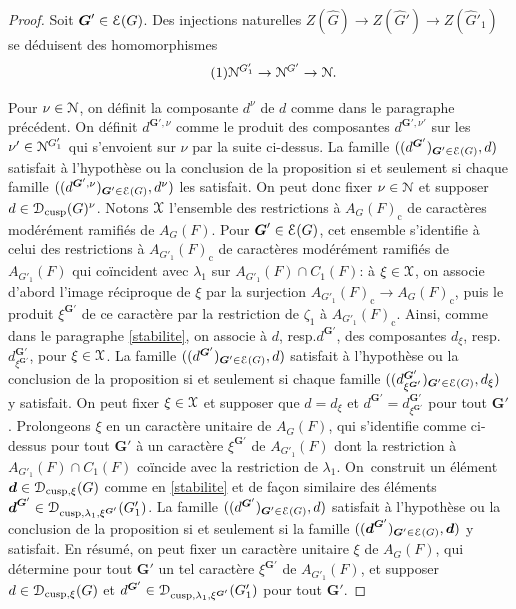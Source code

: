 \documentclass[11pt]{article}
\newcommand{\resp}{resp.\xspace}
\numberwithin{equation}{section}\providecommand{\og}{«\,}\providecommand{\fg}{\,»}
\let\mathcal \EuScript
\newcommand{\rc}{\mathrm{c}}
\newcommand{\cusp}{\mathrm{cusp}}
\newcommand{\bmd}{\boldsymbol{d}}
\newcommand{\bG}{\boldsymbol{G}}
\newcommand{\cD}{\mathcal{D}}
\newcommand{\cE}{\mathcal{E}}
\newcommand{\cN}{\mathcal{N}}
\newcommand{\cX}{\mathcal{X}}
\theoremstyle{plain}
\theoremstyle{definition}
\begin{document}
\begin{proof}
Soit $\bG'\in \cE(G)$. Des injections naturelles $Z(\hat{G})\to Z(\hat{G}')\to Z(\hat{G}'_{1})$ se déduisent des homomorphismes\vspace*{-3pt}
\begin{equation}\tag{1}\label{finale1}
\cN^{G'_{1}}\to \cN^{G'}\to \cN.
\end{equation}

Pour $\nu\in \cN$, on définit la composante $d^{\nu}$ de $d$ comme dans le paragraphe précédent. On définit $d^{\bG',\nu}$ comme le produit des composantes $d^{\bG',\nu'}$ sur les $\nu'\in \cN^{G'_{1}}$ qui s'envoient sur $\nu$ par la suite ci-dessus. La famille $((d^{\bG'})_{\bG'\in \cE(G)},d)$ satisfait à l'hypothèse ou la conclusion de la proposition si et seulement si chaque famille $((d^{\bG',\nu})_{\bG'\in \cE(G)},d^{\nu})$ les satisfait. On peut donc fixer $\nu\in \cN$ et supposer $d\in \cD_{\cusp}(G)^{\nu}$. Notons $\cX$ l'ensemble des restrictions à $A_{G}(F)_{\rc}$ de caractères modérément ramifiés de $A_{G}(F)$. Pour $\bG'\in \cE(G)$, cet ensemble s'identifie à celui des restrictions à $A_{G'_{1}}(F)_{\rc}$ de caractères modérément ramifiés de $A_{G'_{1}}(F)$ qui coïncident avec $\lambda_{1}$ sur $A_{G'_{1}}(F)\cap C_{1}(F)$: à $\xi\in \cX$, on associe d'abord l'image réciproque de $\xi$ par la surjection $A_{G'_{1}}(F)_{\rc}\to A_{G}(F)_{\rc}$, puis le produit $\xi^{\bG'}$ de ce caractère par la restriction de $\zeta_{1}$ à $A_{G'_{1}}(F)_{\rc}$. Ainsi, comme dans le paragraphe \ref{stabilite}, on associe à $d$, \resp $d^{\bG'}$, des composantes $d_{\xi}$, \resp $d^{\bG'}_{\xi^{\bG'}}$, pour $\xi\in \cX$. La famille $((d^{\bG'})_{\bG'\in \cE(G)},d)$ satisfait à l'hypothèse ou la conclusion de la proposition si et seulement si chaque famille $((d^{\bG'}_{\xi^{\bG'}})_{\bG'\in \cE(G)},d_{\xi})$ y satisfait. On peut fixer $\xi\in \cX$ et supposer que $d=d_{\xi}$ et $d^{\bG'}=d^{\bG'}_{\xi^{\bG'}}$ pour tout $\bG'$. Prolongeons $\xi$ en un caractère unitaire de $A_{G}(F)$, qui s'identifie comme ci-dessus pour tout $\bG'$ à un caractère $\xi^{\bG'}$ de $A_{G'_{1}}(F)$ dont la restriction à $A_{G'_{1}}(F)\cap C_{1}(F)$ coïncide avec la restriction de $\lambda_{1}$. On~construit un élément $\bmd\in \cD_{\cusp,\xi}(G)$ comme en \ref{stabilite} et de façon similaire des éléments $\bmd^{\bG'}\in \cD_{\cusp,\lambda_{1},\xi^{\bG'}}(G'_{1})$. La famille $((d^{\bG'})_{\bG'\in \cE(G)},d)$ satisfait à l'hypothèse ou la conclusion de la proposition si et seulement si la famille $((\bmd^{\bG'})_{\bG'\in \cE(G)},\bmd)$ y satisfait. En résumé, on peut fixer un caractère unitaire $\xi$ de $A_{G}(F)$, qui détermine pour tout $\bG'$ un tel caractère $\xi^{\bG'}$ de $A_{G'_{1}}(F)$, et supposer $d\in \cD_{\cusp,\xi}(G)$ et $d^{\bG'}\in \cD_{\cusp,\lambda_{1},\xi^{\bG'}}(G'_{1})$ pour tout $\bG'$.


\end{proof}
\end{document}
